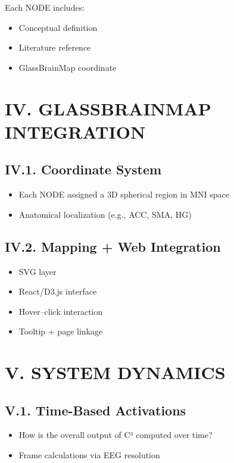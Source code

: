 \documentclass[10pt]{article}
\begin{document}
Each NODE includes:

\begin{itemize}
    \item Conceptual definition
    \item Literature reference
    \item GlassBrainMap coordinate
\end{itemize}

\section*{IV. GLASSBRAINMAP INTEGRATION}

\subsection*{IV.1. Coordinate System}

\begin{itemize}
    \item Each NODE assigned a 3D spherical region in MNI space
    \item Anatomical localization (e.g., ACC, SMA, HG)
\end{itemize}

\subsection*{IV.2. Mapping + Web Integration}

\begin{itemize}
    \item SVG layer
    \item React/D3.js interface
    \item Hover–click interaction
    \item Tooltip + page linkage
\end{itemize}

\section*{V. SYSTEM DYNAMICS}

\subsection*{V.1. Time-Based Activations}

\begin{itemize}
    \item How is the overall output of C³ computed over time?
    \item Frame calculations via EEG resolution
\end{itemize}
\end{document}
